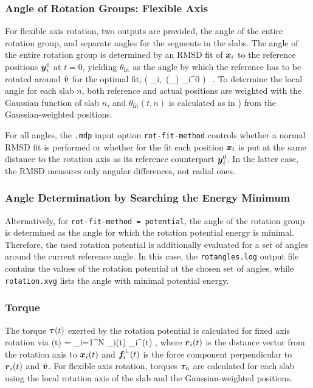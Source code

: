 \subsubsection*{Angle of Rotation Groups: Flexible Axis}
For flexible axis rotation, two outputs are provided, the angle of the
entire rotation group, and separate angles for the segments in the slabs.
The angle of the entire rotation group is determined by an RMSD fit 
of $\mbox{\boldmath ${x}$}_i$
to the reference positions $\mbox{\boldmath ${y}$}_i^0$ at $t=0$, yielding $\theta_\mathrm{fit}$
as the angle by which the reference has to be rotated around $\hat{\mbox{\boldmath ${v}$}}$ 
for the optimal fit,
\beq
{} \big( _i,\ \mathbf{\Omega}(\theta_)
_i^0 \big) \stackrel{!}{=}  \, .
\label{eqn:rmsdfit}
\eeq
To determine the local angle for each slab $n$, both reference and actual
positions are weighted with the Gaussian function of slab $n$, and 
$\theta_\mathrm{fit}(t,n)$ is calculated as in ) from the
Gaussian-weighted positions.

For all angles, the {\tt .mdp} input option {\tt rot-fit-method} controls
whether a normal RMSD fit is performed or whether for the fit each
position $\mbox{\boldmath ${x}$}_i$ is put at the same distance to the rotation axis as its
reference counterpart $\mbox{\boldmath ${y}$}_i^0$. In the latter case, the RMSD
measures only angular differences, not radial ones.


\subsubsection*{Angle Determination by Searching the Energy Minimum}
Alternatively, for {\tt rot-fit-method = potential}, the angle of the rotation 
group is determined as the angle for which the rotation potential energy is minimal.
Therefore, the used rotation potential is additionally evaluated for a set of angles
around the current reference angle. In this case, the {\tt rotangles.log} output file
contains the values of the rotation potential at the chosen set of angles, while 
{\tt rotation.xvg} lists the angle with minimal potential energy.


\subsubsection*{Torque}
\label{torque}
The torque $\mbox{\boldmath ${\tau}$}(t)$ exerted by the rotation potential is calculated for fixed
axis rotation via
\beq
\ve{\tau}(t) = \sum_{i=1}^{N} _i(t) \times {}_{\!i}^\perp(t) ,
\label{eqn:torque}
\eeq
where $\mbox{\boldmath ${r}$}_i(t)$ is the distance vector from the rotation axis to
$\mbox{\boldmath ${x}$}_i(t)$ and $\mbox{\boldmath ${f}$}_{\!i}^\perp(t)$ is the force component
perpendicular to $\mbox{\boldmath ${r}$}_i(t)$ and $\hat{\mbox{\boldmath ${v}$}}$. For flexible axis
rotation, torques $\mbox{\boldmath ${\tau}$}_{\!n}$ are calculated for each slab using the
local rotation axis of the slab and the Gaussian-weighted positions.


